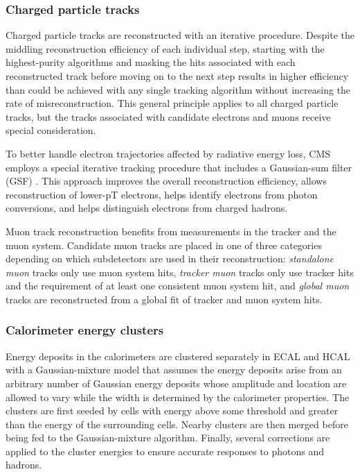 \subsubsection{Charged particle tracks}
Charged particle tracks are reconstructed with an iterative procedure. Despite the middling reconstruction efficiency of each individual step, starting with the highest-purity algorithms and masking the hits associated with each reconstructed track before moving on to the next step results in higher efficiency than could be achieved with any single tracking algorithm without increasing the rate of misreconstruction. This general principle applies to all charged particle tracks, but the tracks associated with candidate electrons and muons receive special consideration.

To better handle electron trajectories affected by radiative energy loss, CMS employs a special iterative tracking procedure that includes a Gaussian-sum filter (GSF) \cite{gsf}. This approach improves the overall reconstruction efficiency, allows reconstruction of lower-pT electrons, helps identify electrons from photon conversions, and helps distinguish electrons from charged hadrons.

Muon track reconstruction benefits from measurements in the tracker and the muon system. Candidate muon tracks are placed in one of three categories depending on which subdetectors are used in their reconstruction: \textit{standalone muon} tracks only use muon system hits, \textit{tracker muon} tracks only use tracker hits and the requirement of at least one consistent muon system hit, and \textit{global muon} tracks are reconstructed from a global fit of tracker and muon system hits.

\subsubsection{Calorimeter energy clusters}
Energy deposits in the calorimeters are clustered separately in ECAL and HCAL with a Gaussian-mixture model that assumes the energy deposits arise from an arbitrary number of Gaussian energy deposits whose amplitude and location are allowed to vary while the width is determined by the calorimeter properties. The clusters are first seeded by cells with energy above some threshold and greater than the energy of the surrounding cells. Nearby clusters are then merged before being fed to the Gaussian-mixture algorithm. Finally, several corrections are applied to the cluster energies to ensure accurate responses to photons and hadrons.

